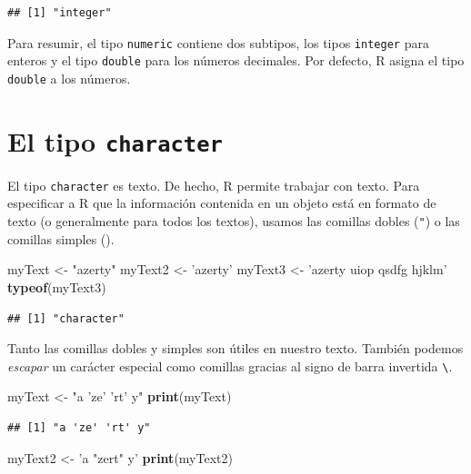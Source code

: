 \documentclass[]{book}
\newenvironment{Shaded}{\begin{snugshade}}{\end{snugshade}}
\newcommand{\KeywordTok}[1]{\textcolor[rgb]{0.13,0.29,0.53}{\textbf{#1}}}
\newcommand{\StringTok}[1]{\textcolor[rgb]{0.31,0.60,0.02}{#1}}
\newcommand{\NormalTok}[1]{#1}
\begin{document}
\begin{verbatim}
## [1] "integer"
\end{verbatim}

Para resumir, el tipo \texttt{numeric} contiene dos subtipos, los tipos
\texttt{integer} para enteros y el tipo \texttt{double} para los números
decimales. Por defecto, R asigna el tipo \texttt{double} a los números.

\section{\texorpdfstring{El tipo
\texttt{character}}{El tipo character}}\label{el-tipo-character}

El tipo \texttt{character} es texto. De hecho, R permite trabajar con
texto. Para especificar a R que la información contenida en un objeto
está en formato de texto (o generalmente para todos los textos), usamos
las comillas dobles (\texttt{"}) o las comillas simples
(\texttt{\textquotesingle{}}).

\begin{Shaded}
\begin{Highlighting}[]
\NormalTok{myText <-}\StringTok{ "azerty"}
\NormalTok{myText2 <-}\StringTok{ 'azerty'}
\NormalTok{myText3 <-}\StringTok{ 'azerty uiop qsdfg hjklm'}
\KeywordTok{typeof}\NormalTok{(myText3)}
\end{Highlighting}
\end{Shaded}

\begin{verbatim}
## [1] "character"
\end{verbatim}

Tanto las comillas dobles y simples son útiles en nuestro texto. También
podemos \emph{escapar} un carácter especial como comillas gracias al
signo de barra invertida \texttt{\textbackslash{}}.

\begin{Shaded}
\begin{Highlighting}[]
\NormalTok{myText <-}\StringTok{ "a 'ze' 'rt' y"}
\KeywordTok{print}\NormalTok{(myText)}
\end{Highlighting}
\end{Shaded}

\begin{verbatim}
## [1] "a 'ze' 'rt' y"
\end{verbatim}

\begin{Shaded}
\begin{Highlighting}[]
\NormalTok{myText2 <-}\StringTok{ 'a "zert" y'}
\KeywordTok{print}\NormalTok{(myText2)}
\end{Highlighting}
\end{Shaded}
\end{document}
